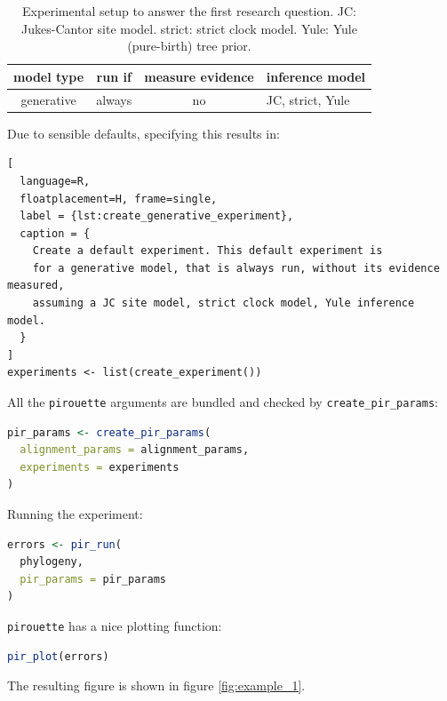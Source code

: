 \documentclass{article}
\begin{document}
\begin{table}
  \begin{tabular}{ | c | c | c | l | }
    \hline
    \textbf{model type} & \textbf{run if} & \textbf{measure evidence} & \textbf{inference model} \\ 
    \hline
    generative & always & no & JC, strict, Yule \\
    \hline
  \end{tabular}
  \caption{
    Experimental setup to answer the first research question.
    JC: Jukes-Cantor site model.
    strict: strict clock model.
    Yule: Yule (pure-birth) tree prior.
  }
\end{table}

Due to sensible defaults, specifying this
results in:

\begin{lstlisting}[
  language=R, 
  floatplacement=H, frame=single,
  label = {lst:create_generative_experiment},
  caption = {
    Create a default experiment. This default experiment is
    for a generative model, that is always run, without its evidence measured,
    assuming a JC site model, strict clock model, Yule inference model.
  }
]
experiments <- list(create_experiment())
\end{lstlisting}

All the \verb;pirouette; arguments are bundled
and checked by \verb;create_pir_params;:

\begin{lstlisting}[language=R, floatplacement=H, frame=single]
pir_params <- create_pir_params(
  alignment_params = alignment_params,
  experiments = experiments
)
\end{lstlisting}

Running the experiment:

\begin{lstlisting}[language=R, floatplacement=H, frame=single]
errors <- pir_run(
  phylogeny,
  pir_params = pir_params
)
\end{lstlisting}

\verb;pirouette; has a nice plotting function:

\begin{lstlisting}[language=R, floatplacement=H, frame=single]
pir_plot(errors)
\end{lstlisting}

The resulting figure is shown in figure \ref{fig:example_1}.
\end{document}
